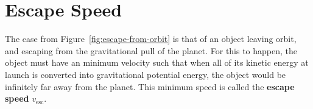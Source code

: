 \section{Escape Speed}
The case from Figure~\ref{fig:escape-from-orbit} is that of an object leaving
orbit, and escaping from the gravitational pull of the planet. For this to
happen, the object must have an minimum velocity such that when all of its
kinetic energy at launch is converted into gravitational potential energy,
the object would be infinitely far away from the planet. This minimum speed
is called the \textbf{escape speed} $v_\text{esc}$.

